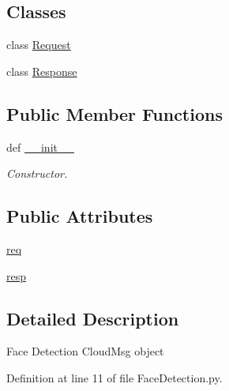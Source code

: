 \subsection*{Classes}
\begin{DoxyCompactItemize}
\item 
class \hyperlink{classRappCloud_1_1CloudMsgs_1_1FaceDetection_1_1FaceDetection_1_1Request}{Request}
\item 
class \hyperlink{classRappCloud_1_1CloudMsgs_1_1FaceDetection_1_1FaceDetection_1_1Response}{Response}
\end{DoxyCompactItemize}
\subsection*{Public Member Functions}
\begin{DoxyCompactItemize}
\item 
def \hyperlink{classRappCloud_1_1CloudMsgs_1_1FaceDetection_1_1FaceDetection_acd855734c53057656eb72b01f6dfeceb}{\-\_\-\-\_\-init\-\_\-\-\_\-}
\begin{DoxyCompactList}\small\item\em Constructor. \end{DoxyCompactList}\end{DoxyCompactItemize}
\subsection*{Public Attributes}
\begin{DoxyCompactItemize}
\item 
\hyperlink{classRappCloud_1_1CloudMsgs_1_1FaceDetection_1_1FaceDetection_a98c24136bc0f0dc81dc5803d88908bd7}{req}
\item 
\hyperlink{classRappCloud_1_1CloudMsgs_1_1FaceDetection_1_1FaceDetection_aff94930d54bef0a230259eda491c3f7a}{resp}
\end{DoxyCompactItemize}


\subsection{Detailed Description}
\begin{DoxyVerb}Face Detection CloudMsg object\end{DoxyVerb}
 

Definition at line 11 of file Face\-Detection.\-py.



